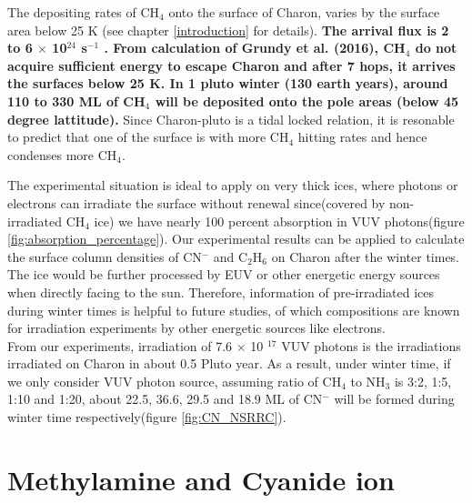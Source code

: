 {The depositing rates of CH$_4$ onto the surface of Charon, varies by the surface area below 25 K (see chapter \ref{introduction} for details). \textbf{The arrival flux is 2 to 6 $\times$ 10$^{24}$ s$^{-1}$ \cite{hoey2017rarefied}. From calculation of Grundy et al. (2016), CH$_4$ do not acquire sufficient energy to escape Charon and after 7 hops, it arrives the surfaces below 25 K. In 1 pluto winter (130 earth years), around 110 to 330 ML of CH$_4$ will be deposited onto the pole areas (below 45 degree lattitude).} Since Charon-pluto is a tidal locked relation, it is resonable to predict that one of the surface is with more CH$_4$ hitting rates and hence condenses more CH$_4$.

The experimental situation is ideal to apply on very thick ices, where photons or electrons can irradiate the surface without renewal since(covered by non-irradiated CH$_4$ ice) we have nearly 100 percent absorption in VUV photons(figure \ref{fig:absorption_percentage}). Our experimental results can be applied to calculate the surface column densities of CN$^-$ and C$_2$H$_6$ on Charon after the winter times. The ice would be further processed by EUV or other energetic energy sources when directly facing to the sun. Therefore, information of pre-irradiated ices during winter times is helpful to future studies, of which compositions are known for irradiation experiments by other energetic sources like electrons.\\

From our experiments, irradiation of 7.6 $\times$ 10 $^{17}$ VUV photons is the irradiations irradiated on Charon in about 0.5 Pluto year. As a result, under winter time, if we only consider VUV photon source, assuming ratio of CH$_4$ to NH$_3$ is 3:2, 1:5, 1:10 and 1:20, about 22.5, 36.6, 29.5 and 18.9 ML of CN$^-$ will be formed during winter time respectively(figure \ref{fig:CN_NSRRC}).

\section {Methylamine and Cyanide ion}


}
